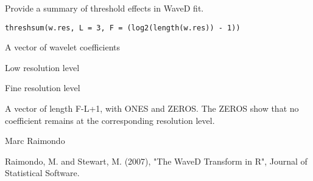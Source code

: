 \documentclass{article}
\begin{document}
\begin{Description}\relax
Provide a summary of threshold effects in WaveD fit.
\end{Description}
\begin{Usage}
\begin{verbatim}
threshsum(w.res, L = 3, F = (log2(length(w.res)) - 1))
\end{verbatim}
\end{Usage}
\begin{Arguments}
\begin{ldescription}
\item[\code{w.res}] A vector of wavelet coefficients 
\item[\code{L}] Low resolution level 
\item[\code{F}] Fine resolution level
\end{ldescription}
\end{Arguments}
\begin{Value}
A vector of length F-L+1, 
with ONES and ZEROS. The ZEROS show that
no coefficient remains at the corresponding resolution level.
\end{Value}
\begin{Author}\relax
Marc Raimondo
\end{Author}
\begin{References}\relax
Raimondo, M. and Stewart, M. (2007),
"The WaveD Transform in R", Journal of Statistical Software.
\end{References}
\begin{SeeAlso}\relax
{}
\end{SeeAlso}
\begin{Examples}
\end{Examples}
\end{document}
